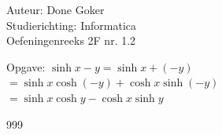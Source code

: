 \documentclass[a4paper]{article}
\begin{document}
  
\noindent \large Auteur: Done Goker \\
\noindent \large Studierichting: Informatica\\
\noindent \large Oefeningenreeks 2F nr. 1.2\\

\medskip

\normalsize

Opgave: $\sinh{ x - y} = \sinh{x + (-y)}$ \\

  $= \sinh x \cosh {(-y)} + \cosh x\sinh{(-y)} $ \\

$= \sinh x \cosh y - \cosh x\sinh y$ \\

\begin{thebibliography}{999}
\end{thebibliography}
\end{document}
